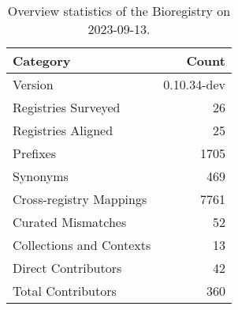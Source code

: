 \begin{table}
\caption{Overview statistics of the Bioregistry on 2023-09-13.}
\label{tab:bioregistry-summary}
\begin{tabular}{lr}
\toprule
Category & Count \\
\midrule
Version & 0.10.34-dev \\
Registries Surveyed & 26 \\
Registries Aligned & 25 \\
Prefixes & 1705 \\
Synonyms & 469 \\
Cross-registry Mappings & 7761 \\
Curated Mismatches & 52 \\
Collections and Contexts & 13 \\
Direct Contributors & 42 \\
Total Contributors & 360 \\
\bottomrule
\end{tabular}
\end{table}
